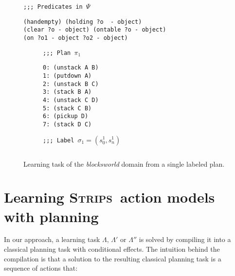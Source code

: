 \documentclass[letterpaper]{article} %
\newcommand{\strips}{\textsc{Strips}}     %
\begin{document}
\begin{figure}
{\tt ;;; Predicates in $\Psi$}
\begin{footnotesize}
\begin{verbatim}
(handempty) (holding ?o  - object)
(clear ?o - object) (ontable ?o - object)
(on ?o1 - object ?o2 - object)
\end{verbatim}
\end{footnotesize}

\vspace{0.2cm}

\begin{subfigure}{.25\textwidth}
{\tt ;;; Plan $\pi_1$}
\begin{footnotesize}
\begin{verbatim}
0: (unstack A B)
1: (putdown A)
2: (unstack B C)
3: (stack B A)
4: (unstack C D)
5: (stack C B)
6: (pickup D)
7: (stack D C)
\end{verbatim}
\end{footnotesize}
\end{subfigure}%
\begin{subfigure}{.6\textwidth}
{\tt ;;; Label $\sigma_1=(s_0^1,s_{n}^1)$}
\begin{lstlisting}[mathescape]
\end{lstlisting}
\vspace{0.1cm}
\vspace{0.6cm}
\end{subfigure}%
 \caption{\small Learning task of the \emph{blocksworld} domain from a single labeled plan.}
\label{fig:lexample}
\end{figure}


\section{Learning \strips\ action models with planning}
In our approach, a learning task $\Lambda$, $\Lambda'$ or $\Lambda''$ is solved by compiling it into a classical planning task with conditional effects. The intuition behind the compilation is that a solution to the resulting classical planning task is a sequence of actions that:
\end{document}
